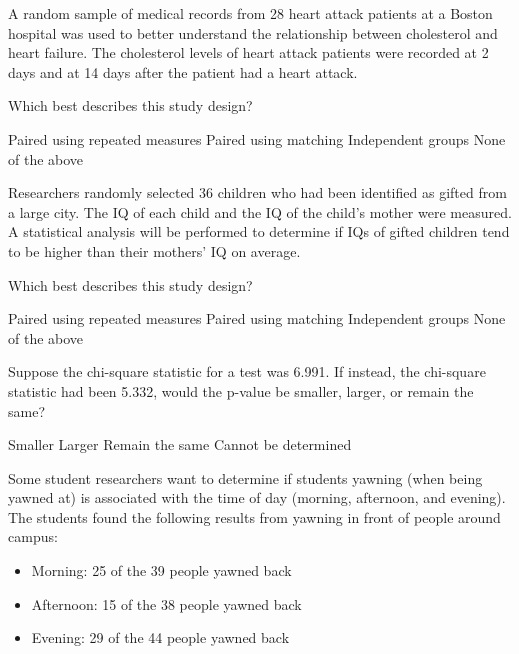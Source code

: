 \documentclass{article}
\begin{document}
\begin{mcquestions}
		\question A random sample of medical records from 28 heart attack patients at a Boston hospital was used to better understand the relationship between cholesterol and heart failure.  The cholesterol levels of heart attack patients were recorded at 2 days and at 14 days after the patient had a heart attack.
		
		Which best describes this study design?
		\begin{mcanswerslist}
			\answer[correct] Paired using repeated measures
			\answer Paired using matching
			\answer Independent groups
			\answer None of the above
		\end{mcanswerslist}
		
		\question Researchers randomly selected 36 children who had been identified as gifted from a large city. The IQ of each child and the IQ of the child's mother were measured. A statistical analysis will be performed to determine if IQs of gifted children tend to be higher than their mothers' IQ on average.
		
		Which best describes this study design?
		
		\begin{mcanswerslist}
			\answer Paired using repeated measures
			\answer[correct] Paired using matching
			\answer Independent groups
			\answer None of the above
		\end{mcanswerslist}
		
		\question Suppose the chi-square statistic for a test was 6.991. If instead, the chi-square statistic had been 5.332, would the p-value be smaller, larger, or remain the same?
		\begin{mcanswerslist}
			\answer Smaller
			\answer[correct] Larger
			\answer Remain the same
			\answer Cannot be determined
		\end{mcanswerslist}
		
		\begin{mcquestioninstruction}
			Some student researchers want to determine if students yawning (when being yawned at) is associated with the time of day (morning, afternoon, and evening). The students found the following results from yawning in front of people around campus:
			\begin{itemize}
				\item Morning: 25 of the 39 people yawned back
				\item Afternoon: 15 of the 38 people yawned back
				\item Evening: 29 of the 44 people yawned back
			\end{itemize}
		\end{mcquestioninstruction}
		

\end{mcquestions}
\end{document}
